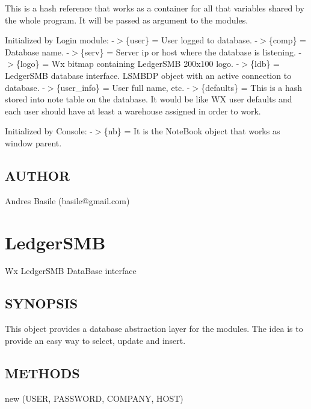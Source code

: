 \begin{description}
\begin{description}
This is a hash reference that works as a container for all that variables shared by the whole program. It will be passed as argument to the modules.



Initialized by Login module:
-$>$\{user\} = User logged to database.
-$>$\{comp\} = Database name.
-$>$\{serv\} = Server ip or host where the database is listening.
-$>$\{logo\} = Wx bitmap containing LedgerSMB 200x100 logo.
-$>$\{ldb\} = LedgerSMB database interface. LSMBDP object with an active connection to database.
-$>$\{user\_info\} = User full name, etc.
-$>$\{defaults\} = This is a hash stored into note table on the database. It would be like WX user defaults and each user should have at least a warehouse assigned in order to work.



Initialized by Console:
-$>$\{nb\} = It is the NoteBook object that works as window parent.

\end{description}
\subsection*{AUTHOR\label{LedgerSMB_AUTHOR}}


Andres Basile (basile@gmail.com)

\section{LedgerSMB\label{LedgerSMB}}


Wx LedgerSMB DataBase interface

\subsection*{SYNOPSIS\label{LedgerSMB_SYNOPSIS}}


This object provides a database abstraction layer for the modules. The idea is to provide an easy way
to select, update and insert.

\subsection*{METHODS\label{LedgerSMB_METHODS}}
\begin{description}

\item[{new (USER, PASSWORD, COMPANY, HOST)}] \mbox{}


\end{description}
\end{description}
